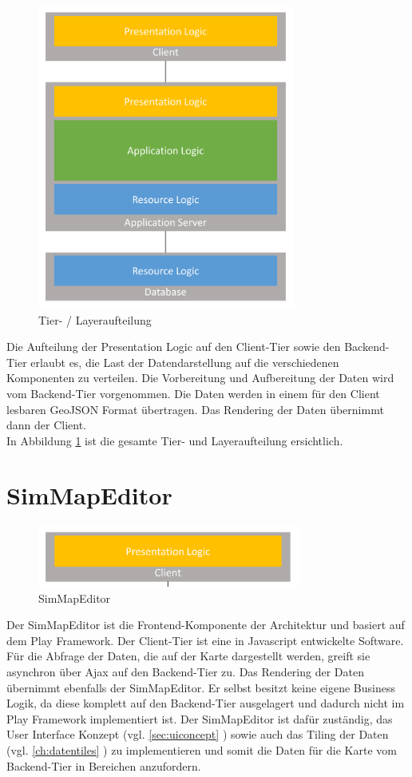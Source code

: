 \begin{figure}[H]
\centering
\includegraphics[height=10cm]{images/layers.png}
\caption{Tier- / Layeraufteilung}
\label{fig:tierlayers}
\end{figure}
\noindent
Die Aufteilung der Presentation Logic auf den Client-Tier sowie den Backend-Tier erlaubt es, die Last der Datendarstellung auf die verschiedenen Komponenten zu verteilen. Die Vorbereitung und Aufbereitung der Daten wird vom Backend-Tier vorgenommen. Die Daten werden in einem für den Client lesbaren GeoJSON \cite{GeoJSON} Format übertragen. Das Rendering der Daten übernimmt dann der Client.\\
In Abbildung \ref{fig:tierlayers} ist die gesamte Tier- und Layeraufteilung ersichtlich.
\section{SimMapEditor}
\begin{figure}[H]
\centering
\includegraphics[height=2cm]{images/presentationlayer.png}
\caption{SimMapEditor}
\label{fig:presentationlayer}
\end{figure}
\noindent
Der SimMapEditor ist die Frontend-Komponente der Architektur und basiert auf dem Play Framework. Der Client-Tier ist eine in Javascript entwickelte Software. Für die Abfrage der Daten, die auf der Karte dargestellt werden, greift sie asynchron über Ajax auf den Backend-Tier zu. Das Rendering der Daten übernimmt ebenfalls der SimMapEditor. Er selbst besitzt keine eigene Business Logik, da diese komplett auf den Backend-Tier ausgelagert und dadurch nicht im Play Framework implementiert ist. Der SimMapEditor ist dafür zuständig, das User Interface Konzept (vgl. \ref{sec:uiconcept} ) sowie auch das Tiling der Daten (vgl. \ref{ch:datentiles} ) zu implementieren und somit die Daten für die Karte vom Backend-Tier in Bereichen anzufordern.
